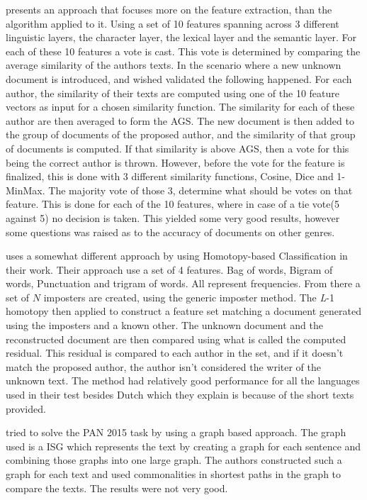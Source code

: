 \cite{castro2015Paper} presents an approach that focuses more on the feature
extraction, than the algorithm applied to it. Using a set of 10 features
spanning across 3 different linguistic layers, the character layer, the lexical
layer and the semantic layer. For each of these 10 features a vote is cast. This
vote is determined by comparing the average similarity of the authors texts. In
the scenario where a new unknown document is introduced, and wished validated
the following happened. For each author, the similarity of their texts are
computed using one of the 10 feature vectors as input for a chosen similarity
function. The similarity for each of these author are then averaged to form
the \gls{AGS}. The new document is then added to the group of documents of the
proposed author, and the similarity of that group of documents is computed.
If that similarity is above \gls{AGS}, then a vote for this being the correct
author is thrown. However, before the vote for the feature is finalized, this
is done with 3 different similarity functions, Cosine, Dice and 1-MinMax. The
majority vote of those 3, determine what should be votes on that feature. This
is done for each of the 10 features, where in case of a tie vote(5 against 5) no
decision is taken. This yielded some very good results, however some questions
was raised as to the accuracy of documents on other genres.

\cite{gutierrez2015} uses a somewhat different approach by using Homotopy-based
Classification in their work. Their approach use a set of 4 features. Bag
of words, Bigram of words, Punctuation and trigram of words. All represent
frequencies. From there a set of $N$ imposters are created, using the generic
imposter method. The \textit{L}-1 homotopy then applied to construct a feature
set matching a document generated using the imposters and a known other. The
unknown document and the reconstructed document are then compared using what is
called the computed residual. This residual is compared to each author in the
set, and if it doesn't match the proposed author, the author isn't considered
the writer of the unknown text. The method had relatively good performance
for all the languages used in their test besides Dutch which they explain is
because of the short texts provided.

\cite{gomezadorno2015} tried to solve the PAN 2015 task by using a graph based
approach. The graph used is a \gls{ISG} which represents the text by creating a
graph for each sentence and combining those graphs into one large graph. The
authors constructed such a graph for each text and used commonalities in
shortest paths in the graph to compare the texts. The results were not very
good.

